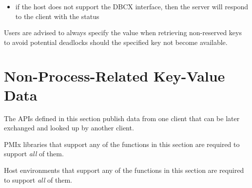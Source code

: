 \begin{enumerate}
\begin{enumerate}
\begin{itemize}
            When the \ac{DBCX} request is received, the target \ac{PMIx}
            server will check its cache for the specified key. If the key is
            not present, the request shall be held until either the target
            process provides the data or, if given, the 
            is reached. In the latter case, the server will return the
             status. The host shall convey the
            result back to the originating \ac{PMIx} server, which will reply
            to the requesting client with the result of the request when the
            host provides it.

            Note that the target server may, depending on \ac{PMIx}
            implementation, never respond if the caller failed to specify a
             and the target process fails to post the
            requested key.

            \item if the host does not support the \ac{DBCX} interface, then
            the server will respond to the client with the
             status
        \end{itemize}
    \end{enumerate}
\end{enumerate}

\adviceuserstart
Users are advised to always specify the  value when
retrieving non-reserved keys to avoid potential deadlocks should the specified
key not become available.
\adviceuserend


\chapter{Non-Process-Related Key-Value Data}
\label{chap:api_kv_mgmt:publish-overview}

The APIs defined in this section publish data from one client that can be later exchanged and looked up by another client.

\adviceimplstart
\ac{PMIx} libraries that support any of the functions in this section are required to support \textit{all} of them.
\adviceimplend

\advicermstart
Host environments that support any of the functions in this section are required to support \textit{all} of them.
\advicermend

